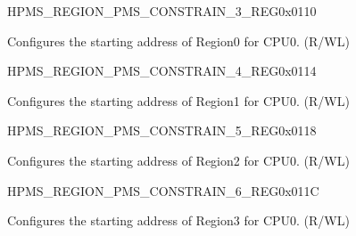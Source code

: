 \begin{register}{H}{PMS\_REGION\_PMS\_CONSTRAIN\_3\_REG}{0x0110}\label{regdesc:PMSREGIONPMSCONSTRAIN3REG}
%
%
\regnewline%
\begin{regdesc}\begin{reglist}
\label{fielddesc:PMSREGIONPMSCONSTRAINADDR0}\item [PMS\_REGION\_PMS\_CONSTRAIN\_ADDR\_0] Configures the starting address of Region0 for CPU0. (R/WL)
\end{reglist}\end{regdesc}
\end{register}


\begin{register}{H}{PMS\_REGION\_PMS\_CONSTRAIN\_4\_REG}{0x0114}\label{regdesc:PMSREGIONPMSCONSTRAIN4REG}
%
%
\regnewline%
\begin{regdesc}\begin{reglist}
\label{fielddesc:PMSREGIONPMSCONSTRAINADDR1}\item [PMS\_REGION\_PMS\_CONSTRAIN\_ADDR\_1] Configures the starting address of Region1 for CPU0. (R/WL)
\end{reglist}\end{regdesc}
\end{register}


\begin{register}{H}{PMS\_REGION\_PMS\_CONSTRAIN\_5\_REG}{0x0118}\label{regdesc:PMSREGIONPMSCONSTRAIN5REG}
%
%
\regnewline%
\begin{regdesc}\begin{reglist}
\label{fielddesc:PMSREGIONPMSCONSTRAINADDR2}\item [PMS\_REGION\_PMS\_CONSTRAIN\_ADDR\_2] Configures the starting address of Region2 for CPU0. (R/WL)
\end{reglist}\end{regdesc}
\end{register}


\begin{register}{H}{PMS\_REGION\_PMS\_CONSTRAIN\_6\_REG}{0x011C}\label{regdesc:PMSREGIONPMSCONSTRAIN6REG}
%
%
\regnewline%
\begin{regdesc}\begin{reglist}
\label{fielddesc:PMSREGIONPMSCONSTRAINADDR3}\item [PMS\_REGION\_PMS\_CONSTRAIN\_ADDR\_3] Configures the starting address of Region3 for CPU0. (R/WL)
\end{reglist}\end{regdesc}
\end{register}


